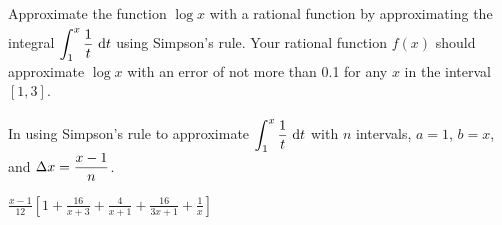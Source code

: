 \begin{Mquestion}
Approximate the function $\log x$ with a rational function by approximating the integral $\displaystyle\int_1^{x\vphantom{\frac{1}{2}}} \frac{1}{t}~\dee{t}$ using Simpson's rule. Your rational function $f(x)$  should approximate $\log x$ with an error of not more than 0.1 for any $x$ in the interval $[1,3]$.
\end{Mquestion}
\begin{hint}
In using Simpson's rule to approximate $\displaystyle\int_1^{x\vphantom{\frac{1}{2}}} \frac{1}{t}~\dee{t}$ with $n$ intervals, $a=1$, $b=x$, and $\Delta x = \dfrac{x-1}{n}$.
\end{hint}
\begin{answer}
$\displaystyle\frac{x-1}{12}\left[1+\frac{16}{x+3}+\frac{4}{x+1}+\frac{16}{3x+1}+\frac{1}{x}\right]$
\end{answer}
